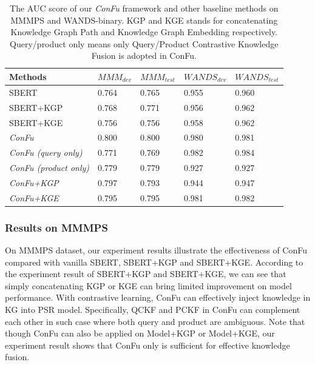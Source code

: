\begin{table}[!th]
  \centering
  \setlength{\tabcolsep}{1pt}
  \begin{threeparttable}
  \caption{The AUC score of our \textit{ConFu} framework and other baseline methods on MMMPS and WANDS-binary. KGP and KGE stands for concatenating Knowledge Graph Path and Knowledge Graph Embedding respectively. Query/product only means only Query/Product Contrastive Knowledge Fusion is adopted in ConFu. }
  \label{tb:mt}
  \centering
  \begin{tabular}{l|l|l|l|l}
    \toprule
    Methods & ${MMM}_{dev}$  & ${MMM}_{test}$ & ${WANDS}_{dev}$  & ${WANDS}_{test}$ \\
    \midrule
    SBERT & 0.764 & 0.765 & 0.955 & 0.960 \\
    SBERT+KGP & 0.768 & 0.771 & 0.956 & 0.962 \\
    SBERT+KGE & 0.756 & 0.756 & 0.958 & 0.962 \\
    \midrule
    \textit{ConFu}  & 0.800 & 0.800 & 0.980 & 0.981  \\
    \textit{ConFu (query only)}  & 0.771 & 0.769 & 0.982 & 0.984 \\
    \textit{ConFu (product only)} & 0.779 & 0.779 & 0.927 & 0.927 \\
    \textit{ConFu+KGP} & 0.797 & 0.793 & 0.944 & 0.947  \\
    \textit{ConFu+KGE} & 0.795 & 0.795 & 0.981 & 0.982 \\
    \bottomrule
  \end{tabular}
  \end{threeparttable}
\end{table}

\subsubsection{Results on MMMPS}

On MMMPS dataset, our experiment results illustrate the effectiveness of ConFu compared with vanilla SBERT, SBERT+KGP and SBERT+KGE. According to the experiment result of SBERT+KGP and SBERT+KGE, we can see that simply concatenating KGP or KGE can bring limited improvement on model performance. With contrastive learning, ConFu can effectively inject knowledge in KG into PSR model. Specifically, QCKF and PCKF in ConFu can complement each other in such case where both query and product are ambiguous. Note that though ConFu can also be applied on Model+KGP or Model+KGE, our experiment result shows that ConFu only is sufficient for effective knowledge fusion.

